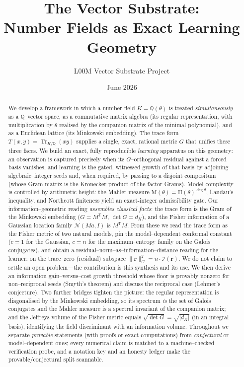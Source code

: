 \documentclass[11pt]{article}
\title{\textbf{The Vector Substrate:\\ Number Fields as Exact Learning Geometry}}
\author{L00M Vector Substrate Project}
\date{June 2026}
\theoremstyle{plain}
\theoremstyle{definition}
\theoremstyle{remark}
\newcommand{\Q}{\mathbb{Q}}
\newcommand{\K}{K}
\newcommand{\Tr}{\operatorname{Tr}}
\newcommand{\Mah}{\mathrm{M}}
\newcommand{\height}{\mathrm{H}}
\newcommand{\Fish}{\mathcal{I}}
\newcommand{\rr}{\mathbf{r}}
\newcommand{\GG}{G}
\newcommand{\transpose}{^{\mathsf{T}}}
\begin{document}
\maketitle

\begin{abstract}
We develop a framework in which a number field $\K=\Q(\theta)$ is treated \emph{simultaneously} as a
$\Q$--vector space, as a commutative matrix algebra (its regular representation, with multiplication by
$\theta$ realised by the companion matrix of the minimal polynomial), and as a Euclidean lattice (its
Minkowski embedding). The trace form $T(x,y)=\Tr_{\K/\Q}(xy)$ supplies a single, exact, rational metric
$\GG$ that unifies these three faces. We build an exact, fully reproducible \emph{learning} apparatus on
this geometry: an observation is captured precisely when its $\GG$--orthogonal residual against a forced
basis vanishes, and learning is the gated, witnessed growth of that basis by adjoining algebraic--integer
seeds and, when required, by passing to a disjoint compositum (whose Gram matrix is the Kronecker product
of the factor Grams). Model complexity is controlled by arithmetic height: the Mahler measure
$\Mah(\theta)=\height(\theta)^{\deg\theta}$, Landau's inequality, and Northcott finiteness yield an
exact-integer admissibility gate. Our information--geometric reading \emph{assembles classical facts}: the
trace form is the Gram of the Minkowski embedding ($\GG=M\transpose M$, $\det\GG=d_\K$), and the Fisher
information of a Gaussian location family $\mathcal N(Ma,I)$ is $M\transpose M$. From these we read the trace
form as the Fisher metric of two natural models, pin the model--dependent conformal constant ($c=1$ for the
Gaussian, $c=n$ for the maximum--entropy family on the Galois conjugates), and obtain a
residual--norm--as--information--distance reading for the learner: on the trace--zero (residual) subspace
$\lVert\rr\rVert_{\GG}^2=n\cdot\Fish(\rr)$. We do not claim to settle an open problem---the contribution is
this synthesis and its use. We then derive an information gain--versus--cost growth threshold whose floor is
provably nonzero for non--reciprocal seeds (Smyth's theorem) and discuss the reciprocal case (Lehmer's
conjecture). Two further bridges tighten the picture: the regular representation is
diagonalised by the Minkowski embedding, so its spectrum \emph{is} the set of Galois conjugates and the
Mahler measure is a spectral invariant of the companion matrix; and the Jeffreys volume of the Fisher
metric equals $\sqrt{\det\GG}=\sqrt{|d_\K|}$ (in an integral basis), identifying the field discriminant with
an information volume.
Throughout we separate \emph{provable} statements (with proofs or exact computations) from \emph{conjectural}
or model--dependent ones; every numerical claim is matched to a machine--checked verification probe, and a
notation key and an honesty ledger make the provable/conjectural split scannable.
\end{abstract}
\end{document}
